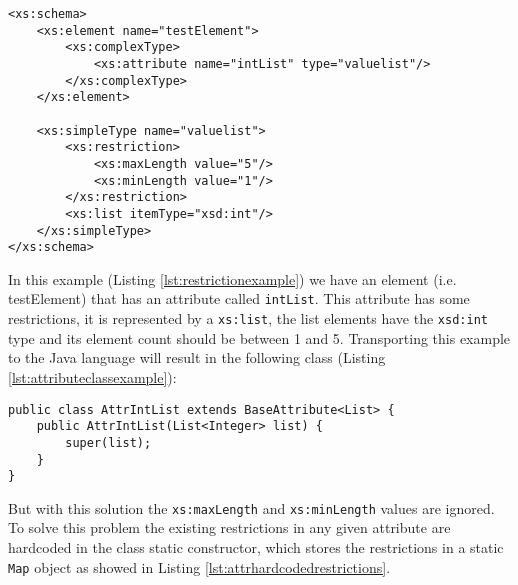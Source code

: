 \bigskip


\begin{minipage}{\linewidth}
\begin{lstlisting}[caption={Restrictions Example},captionpos=b,label={lst:restrictionexample}]
<xs:schema>
    <xs:element name="testElement">
        <xs:complexType>
            <xs:attribute name="intList" type="valuelist"/>
        </xs:complexType>
    </xs:element>
    
    <xs:simpleType name="valuelist">
        <xs:restriction>
            <xs:maxLength value="5"/>
            <xs:minLength value="1"/>
        </xs:restriction>
        <xs:list itemType="xsd:int"/>
    </xs:simpleType>
</xs:schema>
\end{lstlisting}
\end{minipage}

\noindent
In this example (Listing \ref{lst:restrictionexample}) we have an element (i.e. testElement) that has an attribute called \texttt{intList}. This attribute has some restrictions, it is represented by a \texttt{xs:list}, the list elements have the \texttt{xsd:int} type and its element count should be between 1 and 5. Transporting this example to the Java language will result in the following class (Listing \ref{lst:attributeclassexample}):


\begin{minipage}{\linewidth}
\begin{lstlisting}[caption={Attribute Class Example},captionpos=b,label={lst:attributeclassexample}]
public class AttrIntList extends BaseAttribute<List> {
    public AttrIntList(List<Integer> list) {
        super(list);
    }
}
\end{lstlisting}
\end{minipage}

\noindent
But with this solution the \texttt{xs:maxLength} and \texttt{xs:minLength} values are ignored. To solve this problem the existing restrictions in any given attribute are hardcoded in the class static constructor, which stores the restrictions in a static \texttt{Map} object as showed in Listing \ref{lst:attrhardcodedrestrictions}.

\bigskip

